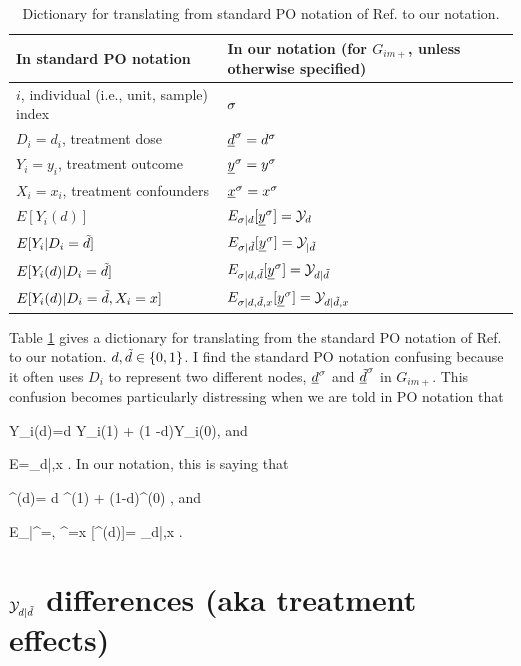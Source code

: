 \begin{table}[h!]
\renewcommand{\arraystretch}{1.5}
\centering
\begin{tabular}{|l|l|}
\hline
\rowcolor[HTML]{ECF4FF} 
In standard PO notation&
In our notation 
(for $G_{im+}$, unless otherwise specified)\\
\hline
$i$, individual (i.e., unit, sample) index& $\sigma$ \\ 
\hline 
$D_i=d_i$, treatment dose & ${\underline{d}}^\sigma=d^\sigma$\\
\hline 
$Y_i=y_i$, treatment outcome& ${\underline{y}}^\sigma=y^\sigma$ \\ 
\hline 
$X_i=x_i$, treatment confounders& ${\underline{x}}^\sigma=x^\sigma$ \\ 
\hline
$E[Y_i(d)]$ & 
$E_{\sigma|d}[{\underline{y}}^\sigma]={\cal Y}_{d}$ \\
\hline
$E[Y_i|D_i={\tilde{d}}]$ & 
$ E_{\sigma|{\tilde{d}}}[{\underline{y}}^\sigma]={\cal Y}_{|{\tilde{d}}}$\\
\hline
$E[Y_i(d)|D_i={\tilde{d}}]$ & 
$E_{\sigma|d,{\tilde{d}}}[{\underline{y}}^\sigma]={\cal Y}_{d|{\tilde{d}}}$\\
\hline
$E[Y_i(d)|D_i={\tilde{d}}, X_i=x]$ & 
$E_{\sigma|d,{\tilde{d}},x}[{\underline{y}}^\sigma]={\cal Y}_{d|{\tilde{d}},x}$\\
\hline
\end{tabular}
\caption{Dictionary for 
translating
from standard PO notation
of Ref.\cite{book-mixtape} to our notation.
}
\label{tab-pot-out-dict}
\end{table}
\renewcommand{\arraystretch}{1}

Table \ref{tab-pot-out-dict}
gives a dictionary for 
translating
from the standard PO notation 
of Ref.\cite{book-mixtape}
to our notation. $d,{\tilde{d}}\in \{0,1\}$.
I find
 the standard PO notation 
confusing because it often uses $D_i$
to represent two different nodes, 
${\underline{d}}^\sigma$ and ${\underline{\tilde{d}}}^\sigma$ in $G_{im+}$. This confusion
becomes particularly distressing
when we are told in PO notation that

\beq Y_i(d)=d Y_i(1) + (1
-d)Y_i(0)\;,
\eeq
and

\beq
E\left[Y_i(d)|D_i=\td, X_i=x\right]
=\caly_{d|\td,x}
\;.
\eeq
In our notation,
this is saying that

\beq 
\rvy^\s(d)= d \rvy^\s(1) +
 (1-d)\rvy^\s(0)
\;,
\eeq
and

\beq
E_{\s|\rvtd^\s=\td, \rvx^\s=x}
[\rvy^\s(d)]=
\caly_{d|\td,x}
\;.
\eeq


\section{${\cal Y}_{d|\tilde{d}}$
differences (aka treatment effects)}


